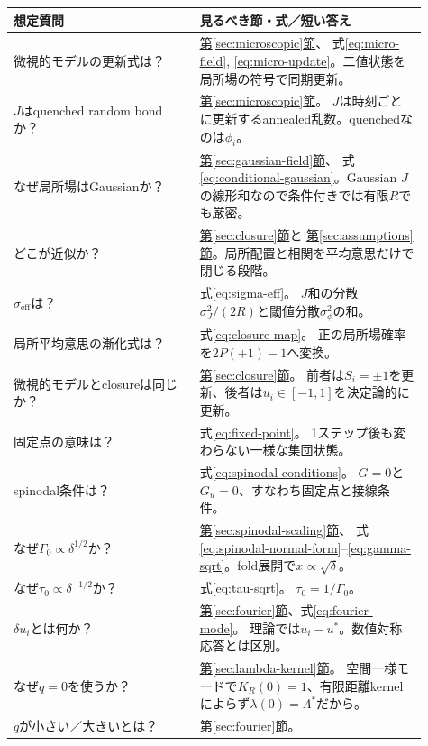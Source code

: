 \documentclass[a4paper,12pt]{ltjsarticle}
\begin{document}
\small
\begin{longtable}{p{0.41\linewidth}p{0.50\linewidth}}
\toprule
想定質問 & 見るべき節・式／短い答え \\
\midrule
\endhead
微視的モデルの更新式は？ & \hyperref[sec:microscopic]{第\ref*{sec:microscopic}節}、
式\eqref{eq:micro-field}, \eqref{eq:micro-update}。二値状態を局所場の符号で同期更新。 \\
$J$はquenched random bondか？ & \hyperref[sec:microscopic]{第\ref*{sec:microscopic}節}。
$J$は時刻ごとに更新するannealed乱数。quenchedなのは$\phi_i$。 \\
なぜ局所場はGaussianか？ & \hyperref[sec:gaussian-field]{第\ref*{sec:gaussian-field}節}、
式\eqref{eq:conditional-gaussian}。Gaussian $J$の線形和なので条件付きでは有限$R$でも厳密。 \\
どこが近似か？ & \hyperref[sec:closure]{第\ref*{sec:closure}節}と
\hyperref[sec:assumptions]{第\ref*{sec:assumptions}節}。局所配置と相関を平均意思だけで閉じる段階。 \\
$\sigma_{\mathrm{eff}}$は？ & 式\eqref{eq:sigma-eff}。
$J$和の分散$\sigma_J^2/(2R)$と閾値分散$\sigma_\phi^2$の和。 \\
局所平均意思の漸化式は？ & 式\eqref{eq:closure-map}。
正の局所場確率を$2P(+1)-1$へ変換。 \\
微視的モデルとclosureは同じか？ & \hyperref[sec:closure]{第\ref*{sec:closure}節}。
前者は$S_i=\pm1$を更新、後者は$u_i\in[-1,1]$を決定論的に更新。 \\
固定点の意味は？ & 式\eqref{eq:fixed-point}。
1ステップ後も変わらない一様な集団状態。 \\
spinodal条件は？ & 式\eqref{eq:spinodal-conditions}。
$G=0$と$G_u=0$、すなわち固定点と接線条件。 \\
なぜ$\Gamma_0\propto\delta^{1/2}$か？ &
\hyperref[sec:spinodal-scaling]{第\ref*{sec:spinodal-scaling}節}、
式\eqref{eq:spinodal-normal-form}--\eqref{eq:gamma-sqrt}。fold展開で$x\propto\sqrt\delta$。 \\
なぜ$\tau_0\propto\delta^{-1/2}$か？ & 式\eqref{eq:tau-sqrt}。
$\tau_0=1/\Gamma_0$。 \\
$\delta u_i$とは何か？ & \hyperref[sec:fourier]{第\ref*{sec:fourier}節}、式\eqref{eq:fourier-mode}。
理論では$u_i-u^*$。数値対称応答とは区別。 \\
なぜ$q=0$を使うか？ & \hyperref[sec:lambda-kernel]{第\ref*{sec:lambda-kernel}節}。
空間一様モードで$K_R(0)=1$、有限距離kernelによらず$\lambda(0)=\Lambda^*$だから。 \\
$q$が小さい／大きいとは？ & \hyperref[sec:fourier]{第\ref*{sec:fourier}節}。

\end{longtable}
\end{document}

